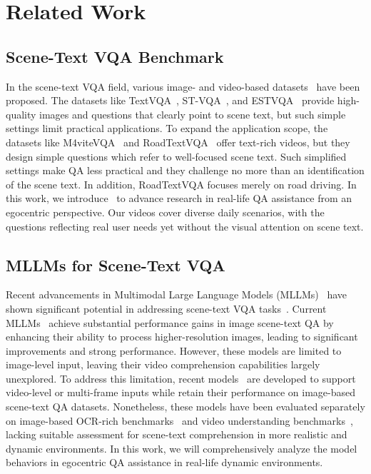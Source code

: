 \section{Related Work}
\subsection{Scene-Text VQA Benchmark}
In the scene-text VQA field, various image- and video-based datasets~\cite{singh2019towards, wang2020general, biten2019scene, zhao2022towards, tom2023reading, mishra2019ocr, liu2024ocrbenchhiddenmysteryocr} have been proposed.  
The datasets like TextVQA~\cite{singh2019towards}, ST-VQA~\cite{biten2019scene}, and ESTVQA~\cite{wang2020general} provide high-quality images and questions that clearly point to scene text, but such simple settings limit practical applications. 
To expand the application scope, the datasets like M4viteVQA~\cite{zhao2022towards} and RoadTextVQA~\cite{tom2023reading} offer text-rich videos, but they design simple questions which refer to well-focused scene text. Such simplified settings make QA less practical and they challenge no more than an identification of the scene text. In addition, RoadTextVQA focuses merely on road driving.
In this work, we introduce \dataset~to advance research in real-life QA assistance from an egocentric perspective. Our videos cover diverse daily scenarios, with the questions reflecting real user needs yet without the visual attention on scene text.


\subsection{MLLMs for Scene-Text VQA}
Recent advancements in Multimodal Large Language Models (MLLMs)~\cite{zhang2024beyond, wang2023cogvlm, zhang2024llava} have shown significant potential in addressing scene-text VQA tasks~\cite{singh2019towards, biten2019scene, liu2024ocrbenchhiddenmysteryocr}.  Current MLLMs~\cite{luo2024feast, zhang2024beyond, li2025flexattention} achieve substantial performance gains in image scene-text QA by enhancing their ability to process higher-resolution images, leading to significant improvements and strong performance. However, these models are limited to image-level input, leaving their video comprehension capabilities largely unexplored. To address this limitation, recent models~\cite{yao2024minicpm, zhang2024llavanextvideo, wang2024qwen2, lin2024vila, chen2024far, yang2022video,yang2021deconfounded,hong2024cogvlm2,chen2024sharegpt4video} are developed to support video-level or multi-frame inputs while retain their performance on image-based scene-text QA datasets. Nonetheless, these models have been evaluated separately on image-based OCR-rich benchmarks~\cite{singh2019towards, biten2019scene, liu2024ocrbenchhiddenmysteryocr, mishra2019ocr, mathew2021docvqa, mathew2022infographicvqa} and video understanding benchmarks~\cite{mangalam2023egoschema, xiao2021next, fu2024video, li2024mvbench,shang2019annotating}, lacking suitable assessment for scene-text comprehension in more realistic and dynamic environments. In this work, we will comprehensively analyze the model behaviors in egocentric QA assistance in real-life dynamic environments.



